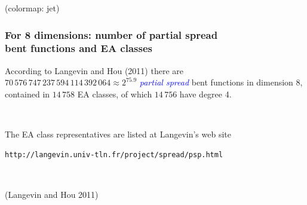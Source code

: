 \documentclass[pdf,sprung,slideColor,nocolorBG]{beamer}
\newenvironment{colortheme}[1]{
\def\ProvidesPackageRCS $##1${\relax}
\renewcommand{\ProcessOptions}{\relax}
\makeatletter

\makeatother
}{}
\newcommand{\slidecite}[1]{\tiny{(#1)}\normalsize{}}
\newcommand{\Emph}[1]{\emph{\textcolor{blue}{#1}}}
\begin{document}
\begin{colortheme}{jubata}
\begin{frame}
\begin{figure}
\begin{minipage}{.48\textwidth}
  \label{fig:cast128_7_21_bent_cayley_graph_index_matrix}
\end{minipage}%
\end{figure}
\slidecite{colormap: jet}
\end{frame}
\end{colortheme}

\begin{colortheme}{seagull}

\begin{frame}[fragile]
\frametitle{For 8 dimensions: number of partial spread \\ bent functions and EA classes}

According to Langevin and Hou (2011)
there are $70\,576\,747\,237\,594\,114\,392\,064 \approx 2^{75.9}$ \Emph{partial spread} bent functions in dimension 8,
contained in $14\,758$ EA classes, of which $14\,756$ have degree 4.

~

The EA class representatives are listed at Langevin's web site

\begin{verbatim}
http://langevin.univ-tln.fr/project/spread/psp.html
\end{verbatim}

~

\slidecite{Langevin and Hou 2011}
\end{frame}

\end{colortheme}
\end{document}
